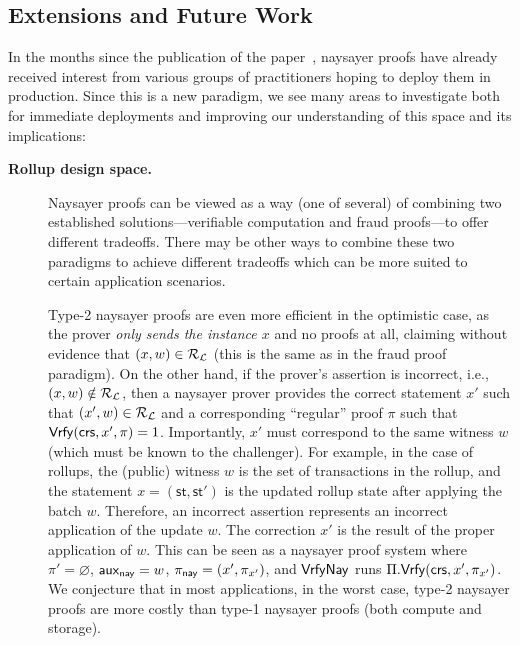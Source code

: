 \subsection{Extensions and Future Work}\label{sec:naysayer_extensions}


In the months since the publication of the paper~\cite{FC:SerGlaBon24}, naysayer proofs have already received interest from various groups of practitioners hoping to deploy them in production. Since this is a new paradigm, we see many areas to investigate both for immediate deployments and improving our understanding of this space and its implications:

\begin{description}
    \item[\textbf{Rollup design space.}] Naysayer proofs can be viewed as a way (one of several) of combining two established solutions---verifiable computation and fraud proofs---to offer different tradeoffs. There may be other ways to combine these two paradigms to achieve different tradeoffs which can be more suited to certain application scenarios.
    
     Type-2 naysayer proofs are even more efficient in the optimistic case, as the prover \emph{only sends the instance $x$} and no proofs at all, claiming without evidence that $(x,w) \in \mathcal{R}_{\mathcal{L}}$ (this is the same as in the fraud proof paradigm). On the other hand, if the prover's assertion is incorrect, i.e., $(x,w) \notin \mathcal{R}_{\mathcal{L}}$, then a naysayer prover provides the correct statement $x'$ such that $(x',w) \in \mathcal{R}_{\mathcal{L}}$ 
    and a corresponding ``regular'' proof $\pi$ such that $\mathsf{Vrfy}(\mathsf{crs}, x', \pi) = 1$. Importantly, $x'$ must correspond to the same witness $w$ (which must be known to the challenger). For example, in the case of rollups, the (public) witness $w$ is the set of transactions in the rollup, and the statement $x = (\mathsf{st}, \mathsf{st}')$ is the updated rollup state after applying the batch $w$. Therefore, an incorrect assertion represents an incorrect application of the update $w$. The correction $x'$ is the result of the proper application of $w$.
    This can be seen as a naysayer proof system where $\pi' = \varnothing$, $\mathsf{aux}_{\mathsf{nay}} = w$, $\pi_{\mathsf{nay}} = (x', \pi_{x'})$, and ${\mathsf{Vrfy}}\mathsf{Nay}$ runs $\Pi.\mathsf{Vrfy}(\mathsf{crs}, x', \pi_{x'})$.
    We conjecture that in most applications, in the worst case, type-2 naysayer proofs are more costly than type-1 naysayer proofs (both compute and storage).


\end{description}
